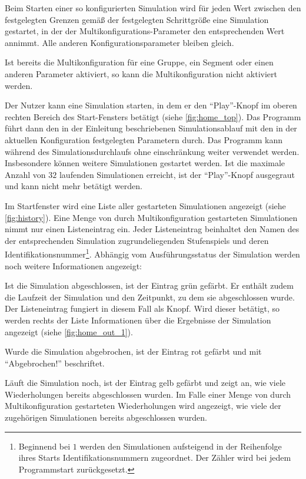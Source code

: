 \documentclass[parskip=full,11pt]{scrartcl}
\begin{document}
Beim Starten einer so konfigurierten Simulation wird für jeden Wert zwischen den festgelegten Grenzen gemäß der festgelegten Schrittgröße eine Simulation gestartet, in der der Multikonfigurations-Parameter den entsprechenden Wert annimmt. Alle anderen Konfigurationsparameter bleiben gleich.

Ist bereits die Multikonfiguration für eine Gruppe, ein Segment oder einen anderen Parameter aktiviert, so kann die Multikonfiguration nicht aktiviert werden.

Der \Gls{Nutzer} kann eine Simulation starten, in dem er den \enquote{Play}-Knopf im oberen rechten Bereich des Start-Fensters betätigt (siehe \cref{fig:home_top}). Das Programm führt dann den in der Einleitung beschriebenen Simulationsablauf mit den in der aktuellen Konfiguration festgelegten Parametern durch. Das Programm kann während des Simulationsdurchlaufs ohne einschränkung weiter verwendet werden. Insbesondere können weitere Simulationen gestartet werden. Ist die maximale Anzahl von \(32\) laufenden Simulationen erreicht, ist der \enquote{Play}-Knopf ausgegraut und kann nicht mehr betätigt werden.

Im Startfenster wird eine Liste aller gestarteten Simulationen angezeigt (siehe \cref{fig:history}). Eine Menge von durch Multikonfiguration gestarteten Simulationen nimmt nur einen Listeneintrag ein. Jeder Listeneintrag beinhaltet den Namen des der entsprechenden Simulation zugrundeliegenden Stufenspiels und deren Identifikationsnummer\footnote{Beginnend bei \(1\) werden den Simulationen aufsteigend in der Reihenfolge ihres Starts Identifikationsnummern zugeordnet. Der Zähler wird bei jedem Programmstart zurückgesetzt.}. Abhängig vom Ausführungsstatus der Simulation werden noch weitere Informationen angezeigt:

Ist die Simulation abgeschlossen, ist der Eintrag grün gefärbt. Er enthält zudem die Laufzeit der Simulation und den Zeitpunkt, zu dem sie abgeschlossen wurde. Der Listeneintrag fungiert in diesem Fall als Knopf. Wird dieser betätigt, so werden rechts der Liste Informationen über die Ergebnisse der Simulation angezeigt (siehe \cref{fig:home_out_1}).

Wurde die Simulation abgebrochen, ist der Eintrag rot gefärbt und mit \enquote{Abgebrochen!} beschriftet.

Läuft die Simulation noch, ist der Eintrag gelb gefärbt und zeigt an, wie viele Wiederholungen bereits abgeschlossen wurden. Im Falle einer Menge von durch Multikonfiguration gestarteten Wiederholungen wird angezeigt, wie viele der zugehörigen Simulationen bereits abgeschlossen wurden.
\end{document}
